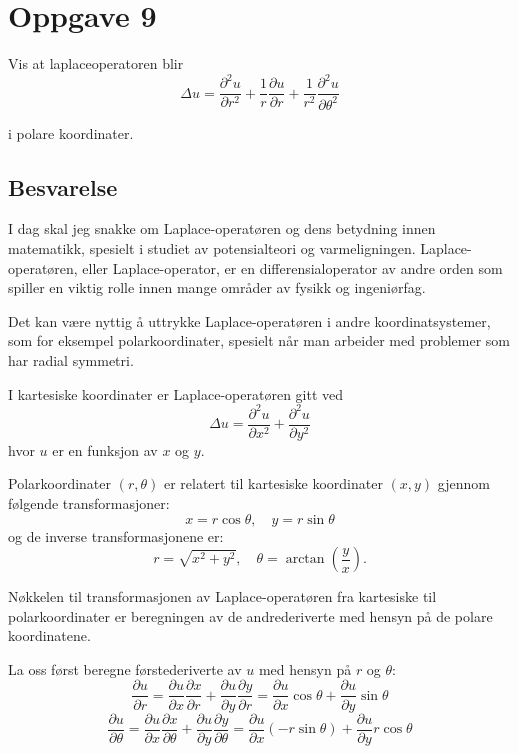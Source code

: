 \section{Oppgave 9}
Vis at laplaceoperatoren blir
\begin{equation*}
    \Delta u=\frac{\partial^{2} u}{\partial r^{2}}+\frac{1}{r} \frac{\partial u}{\partial r}+\frac{1}{r^{2}} \frac{\partial^{2} u}{\partial \theta^{2}}
\end{equation*}

i polare koordinater.

\subsection*{Besvarelse}


I dag skal jeg snakke om Laplace-operatøren og dens betydning innen matematikk, spesielt i studiet av potensialteori og varmeligningen. Laplace-operatøren, eller Laplace-operator, er en differensialoperator av andre orden som spiller en viktig rolle innen mange områder av fysikk og ingeniørfag.

Det kan være nyttig å uttrykke Laplace-operatøren i andre koordinatsystemer, som for eksempel polarkoordinater, spesielt når man arbeider med problemer som har radial symmetri.

I kartesiske koordinater er Laplace-operatøren gitt ved
\begin{equation*}
\Delta u = \frac{\partial^{2} u}{\partial x^{2}} + \frac{\partial^{2} u}{\partial y^{2}}
\end{equation*}
hvor $u$ er en funksjon av $x$ og $y$.

Polarkoordinater $(r, \theta)$ er relatert til kartesiske koordinater $(x, y)$ gjennom følgende transformasjoner:
\begin{equation*}
x = r\cos\theta, \quad y = r\sin\theta
\end{equation*}
og de inverse transformasjonene er:
\begin{equation*}
r = \sqrt{x^{2} + y^{2}}, \quad \theta = \arctan\left(\frac{y}{x}\right).
\end{equation*}

Nøkkelen til transformasjonen av Laplace-operatøren fra kartesiske til polarkoordinater er beregningen av de andrederiverte med hensyn på de polare koordinatene.

La oss først beregne førstederiverte av $u$ med hensyn på $r$ og $\theta$:
\begin{equation*}
\frac{\partial u}{\partial r} = \frac{\partial u}{\partial x}\frac{\partial x}{\partial r} + \frac{\partial u}{\partial y}\frac{\partial y}{\partial r} = \frac{\partial u}{\partial x}\cos\theta + \frac{\partial u}{\partial y}\sin\theta
\end{equation*}
\begin{equation*}
\frac{\partial u}{\partial \theta} = \frac{\partial u}{\partial x}\frac{\partial x}{\partial \theta} + \frac{\partial u}{\partial y}\frac{\partial y}{\partial \theta} = \frac{\partial u}{\partial x}(-r\sin\theta) + \frac{\partial u}{\partial y}r\cos\theta
\end{equation*}

